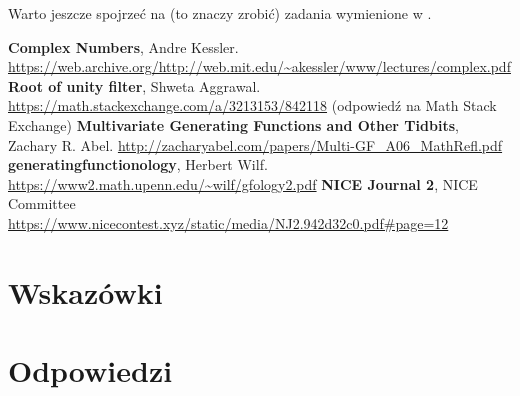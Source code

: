 \documentclass{scrartcl}
\begin{document}
    Warto jeszcze spojrzeć na (to znaczy zrobić) zadania wymienione w \cite{ref:NICE}.

\begin{thebibliography}{9}
     \textbf{Complex Numbers}, Andre Kessler.
        \url{https://web.archive.org/http://web.mit.edu/~akessler/www/lectures/complex.pdf}
     \textbf{Root of unity filter}, Shweta Aggrawal.
        \url{https://math.stackexchange.com/a/3213153/842118}
        (odpowiedź na Math Stack Exchange)
     \textbf{Multivariate Generating Functions and Other Tidbits}, Zachary R. Abel.
        \url{http://zacharyabel.com/papers/Multi-GF_A06_MathRefl.pdf}
     \textbf{generatingfunctionology}, Herbert Wilf.
        \url{https://www2.math.upenn.edu/~wilf/gfology2.pdf}
     \textbf{NICE Journal 2}, NICE Committee
        \url{https://www.nicecontest.xyz/static/media/NJ2.942d32c0.pdf#page=12}
\end{thebibliography}

\newpage
\section{Wskazówki}
    \makehints

\section{Odpowiedzi}
    \makeanswers
\end{document}
